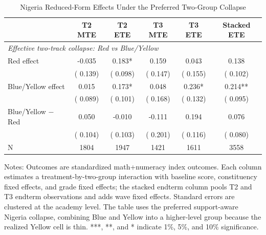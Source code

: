 \begin{table}[!htbp]
\centering
\caption{Nigeria Reduced-Form Effects Under the Preferred Two-Group Collapse}
\label{tab:ng_two_group}
\begin{threeparttable}
\footnotesize
\begin{tabular}[t]{lccccc}
\toprule
 & T2 MTE & T2 ETE & T3 MTE & T3 ETE & Stacked ETE \\
\midrule
\multicolumn{6}{l}{\textit{Effective two-track collapse: Red vs Blue/Yellow}} \\
Red effect &  -0.035 &   0.183* &   0.159 &   0.043 &   0.138 \\
 & (  0.139) & (  0.098) & (  0.147) & (  0.155) & (  0.102) \\
Blue/Yellow effect &   0.015 &   0.173* &   0.048 &   0.236* &   0.214** \\
 & (  0.089) & (  0.101) & (  0.168) & (  0.132) & (  0.095) \\
Blue/Yellow $-$ Red &   0.050 &  -0.010 &  -0.111 &   0.194 &   0.076 \\
 & (  0.104) & (  0.103) & (  0.201) & (  0.116) & (  0.080) \\
\addlinespace
N & 1804 & 1947 & 1421 & 1611 & 3558 \\
\bottomrule
\end{tabular}
\begin{tablenotes}
\footnotesize
\item Notes: Outcomes are standardized math+numeracy index outcomes. Each column estimates a treatment-by-two-group interaction with baseline score, constituency fixed effects, and grade fixed effects; the stacked endterm column pools T2 and T3 endterm observations and adds wave fixed effects. Standard errors are clustered at the academy level. The table uses the preferred support-aware Nigeria collapse, combining Blue and Yellow into a higher-level group because the realized Yellow cell is thin. ***, **, and * indicate 1\%, 5\%, and 10\% significance.
\end{tablenotes}
\end{threeparttable}
\end{table}
